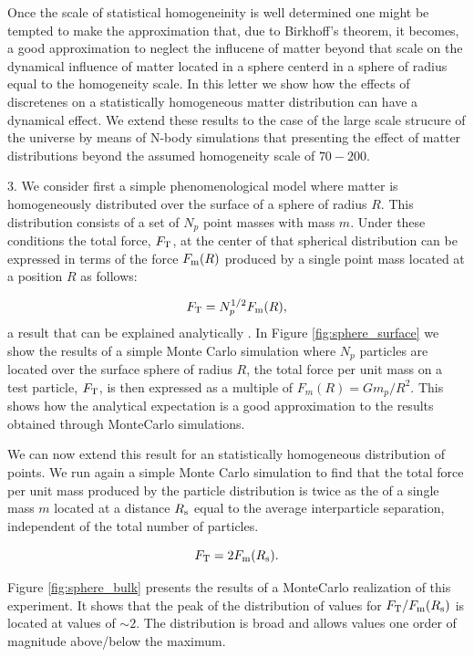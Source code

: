 \documentclass{article}
\newcommand{\hMpc}{{\ifmmode{h^{-1}{\rm Mpc}}\else{$h^{-1}$Mpc }\fi}}
\begin{document}
Once the scale of statistical homogeneinity is well determined one
might be tempted to make the approximation that,
due to Birkhoff's theorem, it becomes, a good approximation to neglect
the influcene of matter beyond that scale on the dynamical influence
of matter located in a sphere centerd in a sphere of radius equal to
the homogeneity scale.  In this letter we show how the effects of
discretenes on a statistically homogeneous matter distribution can
have a dynamical effect. We extend these results to the case of the
large scale strucure of the universe by means of N-body simulations
that presenting the effect of matter distributions beyond the assumed
homogeneity scale of $70-200$\hMpc.
 


3. We consider first a simple phenomenological model where matter is
homogeneously distributed over the surface of a sphere of radius
$R$. This distribution consists of a set of $N_p$ point masses with mass
$m$. Under these conditions the total force, $F_{\rm T}$, at the
center of that spherical distribution can be expressed in terms of the
force $F_{\rm m}(R)$ produced by a single point mass located at a
position  $R$ as follows:  

\begin{equation}
F_{\rm T } = N_p^{1/2} F_{\rm m} (R),
\end{equation}
%
a result that can be explained analytically
\cite{Chandra43,Carati2008}. In Figure \ref{fig:sphere_surface} we
show the results of a simple Monte Carlo simulation where $N_p$
particles are located over the surface sphere of radius $R$, the total force per
unit mass on a test particle, $F_{\rm T}$, is then expressed as a
multiple of $F_{m}(R)=Gm_p/R^2$. This shows how the analytical
expectation is a good approximation to the results obtained through
MonteCarlo simulations.




We can now extend this result for an statistically homogeneous distribution
of points. We run again a simple Monte Carlo simulation to find that the total force per unit mass produced by the particle distribution is twice as
the of a single mass $m$ located at a distance $R_{\rm s}$ equal to
the average interparticle separation, independent of the total number of
particles. 

\begin{equation}
F_{\rm T} = 2 F_{\rm m}(R_{\rm s}).
\end{equation}

Figure \ref{fig:sphere_bulk} presents the results of a MonteCarlo
realization of this experiment. It shows that the peak of the
distribution of values for $F_{\rm T}/F_{\rm m}(R_{\rm s})$ is
located at values of $\sim 2$. The distribution is broad and allows
values one order of magnitude above/below the maximum. 
\end{document}
